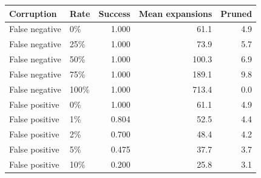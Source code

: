 \begin{tabular}{llrrr}
\toprule
Corruption & Rate & Success & Mean expansions & Pruned \\
\midrule
False negative & 0\% & 1.000 & 61.1 & 4.9 \\
False negative & 25\% & 1.000 & 73.9 & 5.7 \\
False negative & 50\% & 1.000 & 100.3 & 6.9 \\
False negative & 75\% & 1.000 & 189.1 & 9.8 \\
False negative & 100\% & 1.000 & 713.4 & 0.0 \\
False positive & 0\% & 1.000 & 61.1 & 4.9 \\
False positive & 1\% & 0.804 & 52.5 & 4.4 \\
False positive & 2\% & 0.700 & 48.4 & 4.2 \\
False positive & 5\% & 0.475 & 37.7 & 3.7 \\
False positive & 10\% & 0.200 & 25.8 & 3.1 \\
\bottomrule
\end{tabular}
